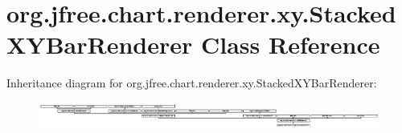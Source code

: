 \hypertarget{classorg_1_1jfree_1_1chart_1_1renderer_1_1xy_1_1_stacked_x_y_bar_renderer}{}\section{org.\+jfree.\+chart.\+renderer.\+xy.\+Stacked\+X\+Y\+Bar\+Renderer Class Reference}
\label{classorg_1_1jfree_1_1chart_1_1renderer_1_1xy_1_1_stacked_x_y_bar_renderer}
Inheritance diagram for org.\+jfree.\+chart.\+renderer.\+xy.\+Stacked\+X\+Y\+Bar\+Renderer\+:\begin{figure}[H]
\begin{center}
\leavevmode
\includegraphics[height=0.883281cm]{classorg_1_1jfree_1_1chart_1_1renderer_1_1xy_1_1_stacked_x_y_bar_renderer}
\end{center}
\end{figure}
